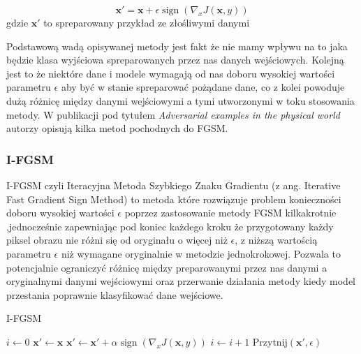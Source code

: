 \documentclass[
    left=2.5cm,         %
    right=2.5cm,        %
    top=2.5cm,          %
    bottom=3cm,         %
    bindingoffset=6mm,  %
    nohyphenation=false %
]{eiti/eiti-thesis}
\renewcommand{\vec}[1]{\mathbf{#1}}
\begin{document}
    \begin{equation}
    \vec{x'} = \vec{x} + \epsilon\operatorname{sign}(\nabla_{x} J(\vec{x}, y))
    \end{equation}
    gdzie $\vec{x'}$ to spreparowany przykład ze złośliwymi danymi


    Podstawową wadą opisywanej metody jest fakt że nie mamy wpływu na to jaka będzie klasa wyjściowa
    spreparowanych przez nas danych wejściowych. Kolejną jest to że niektóre dane i modele wymagają od nas
    doboru wysokiej wartości parametru $\epsilon$ aby być w stanie spreparować pożądane dane, co z kolei powoduje dużą
    różnicę między danymi wejściowymi a tymi utworzonymi w toku stosowania metody.
    W publikacji pod tytułem \textit{Adversarial examples in the physical world}\cite{DBLP:journals/corr/KurakinGB16}
    autorzy opisują kilka metod pochodnych do FGSM.

    \subsubsection{I-FGSM}\label{ifgsm-algorith}
    I-FGSM czyli Iteracyjna Metoda Szybkiego Znaku Gradientu (z ang. Iterative Fast Gradient Sign Method) to metoda
    które rozwiązuje problem konieczności doboru wysokiej wartości $\epsilon$ poprzez zastosowanie metody FGSM kilkakrotnie
    ,jednocześnie zapewniając pod koniec każdego kroku że przygotowany każdy piksel obrazu nie różni się od oryginału o więcej
    niż $\epsilon$, z niższą wartością parametru $\epsilon$ niż wymagane oryginalnie w metodzie jednokrokowej.
    Pozwala to  potencjalnie ograniczyć różnicę między preparowanymi przez nas danymi a oryginalnymi danymi wejściowymi
    oraz przerwanie działania metody kiedy model przestania poprawnie klasyfikować dane wejściowe.

    \begin{algorithm}
    \caption{I-FGSM}\label{IFGSM}
    \begin{algorithmic}[1]
    \State $i \gets 0$
    \State $\vec{x'} \gets \vec{x}$
        \State $\vec{x'} \gets \vec{x'} + \alpha\operatorname{sign}(\nabla_{x} J(\vec{x}, y))$
        \State $i \gets i+1$
        \State $\text{Przytnij}(\vec{x'}, \epsilon)$
    \EndWhile
    \end{algorithmic}
    \end{algorithm}
\end{document}
